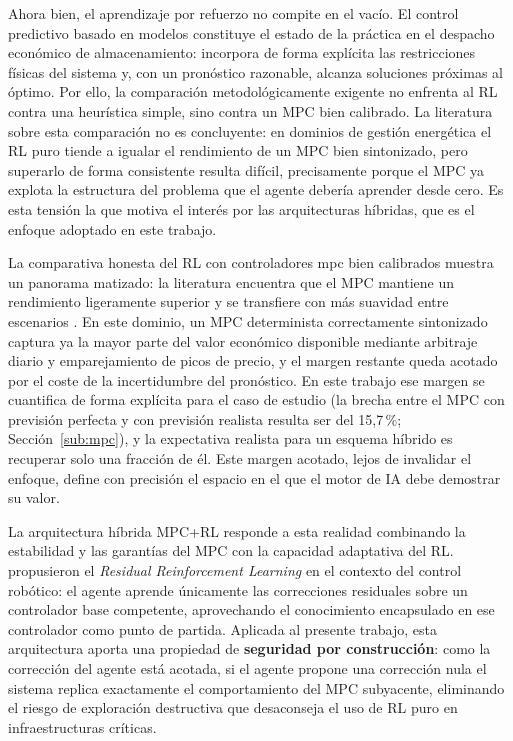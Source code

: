 \documentclass[12pt, a4paper, twoside]{report}
\begin{document}
Ahora bien, el aprendizaje por refuerzo no compite en el vacío. El control
predictivo basado en modelos \citep{Rawlings2017} constituye el estado de la
práctica en el despacho económico de almacenamiento: incorpora de forma
explícita las restricciones físicas del sistema y, con un pronóstico razonable,
alcanza soluciones próximas al óptimo. Por ello, la comparación
metodológicamente exigente no enfrenta al RL contra una heurística simple, sino
contra un MPC bien calibrado. La literatura sobre esta comparación no es
concluyente: en dominios de gestión energética el RL puro tiende a igualar el
rendimiento de un MPC bien sintonizado, pero superarlo de forma consistente
resulta difícil, precisamente porque el MPC ya explota la estructura del
problema que el agente debería aprender desde cero. Es esta tensión la que
motiva el interés por las arquitecturas híbridas, que es el enfoque adoptado en
este trabajo.

La comparativa honesta del RL con controladores \acrshort{mpc} bien calibrados
muestra un panorama matizado: la literatura encuentra que el MPC mantiene un
rendimiento ligeramente superior y se transfiere con más suavidad entre
escenarios \citep{Zhan2023}. En este dominio, un MPC determinista
correctamente sintonizado captura ya la mayor parte del valor económico
disponible mediante arbitraje diario y emparejamiento de picos de precio, y el
margen restante queda acotado por el coste de la incertidumbre del pronóstico.
En este trabajo ese margen se cuantifica de forma explícita para el caso de
estudio (la brecha entre el MPC con previsión perfecta y con previsión
realista resulta ser del 15{,}7\,\%; Sección~\ref{sub:mpc}), y la expectativa
realista para un esquema híbrido es recuperar solo una fracción de él. Este margen acotado, lejos de invalidar el enfoque, define con
precisión el espacio en el que el motor de IA debe demostrar su valor.

La arquitectura híbrida MPC+RL responde a esta realidad combinando la
estabilidad y las garantías del MPC con la capacidad adaptativa del RL.
\citet{Johannink2019} propusieron el \textit{Residual Reinforcement Learning}
en el contexto del control robótico: el agente aprende únicamente las
correcciones residuales sobre un controlador base competente, aprovechando el
conocimiento encapsulado en ese controlador como punto de partida. Aplicada al
presente trabajo, esta arquitectura aporta una propiedad de \textbf{seguridad
por construcción}: como la corrección del agente está acotada, si el agente
propone una corrección nula el sistema replica exactamente el comportamiento
del MPC subyacente, eliminando el riesgo de exploración destructiva que
desaconseja el uso de RL puro en infraestructuras críticas.
\end{document}
